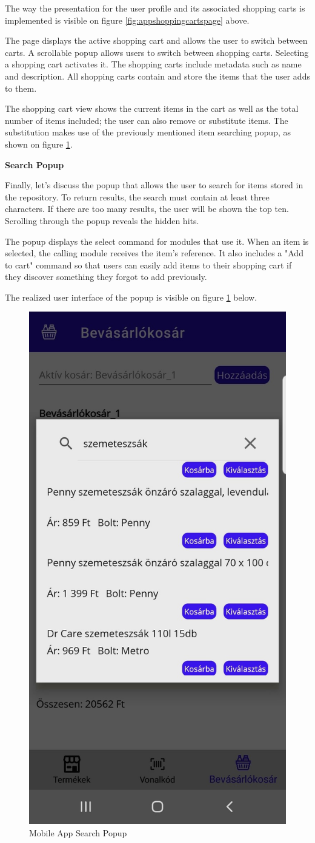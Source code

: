 The way the presentation for the user profile and its associated shopping carts is implemented is visible on figure \ref{fig:appshoppingcartspage} above.

The page displays the active shopping cart and allows the user to switch between carts.  A scrollable popup allows users to switch between shopping carts. Selecting a shopping cart activates it. The shopping carts include metadata such as name and description. All shopping carts contain and store the items that the user adds to them. 

The shopping cart view shows the current items in the cart as well as the total number of items included; the user can also remove or substitute items. The substitution makes use of the previously mentioned item searching popup, as shown on figure \ref{fig:appsearchpopup}.

\noindent\textbf{Search Popup}

Finally, let's discuss the popup that allows the user to search for items stored in the repository. To return results, the search must contain at least three characters. If there are too many results, the user will be shown the top ten.  Scrolling through the popup reveals the hidden hits. 

The popup displays the select command for modules that use it. When an item is selected, the calling module receives the item's reference. It also includes a "Add to cart" command so that users can easily add items to their shopping cart if they discover something they forgot to add previously.

The realized user interface of the popup is visible on figure \ref{fig:appsearchpopup} below.

\begin{figure}[H]
	\centering
	\includegraphics[width=0.3\linewidth]{img/app_search.png}
	\caption{Mobile App Search Popup}
	\label{fig:appsearchpopup}
\end{figure}
